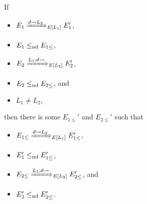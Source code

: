 \begin{lem}
\label{lem:choice-control-lifting}
If
\begin{itemize}
  \item $E_1 \ctrlsteploc[d \sendsto L_2]{L_1} E_1'$,
  \item $E_1 \leq_{\text{nd}} E_{1 \leq}$,
  \item $E_2 \ctrlsteploc[L_1;d \sendsto]{L_2} E_2'$,
  \item $E_2 \leq_{\text{nd}} E_{2 \leq}$, and
  \item $L_1 \neq L_2$,
\end{itemize}
then there is some $E_{1 \leq}'$ and $E_{2 \leq}'$ such that
\begin{itemize}
  \item $E_{1 \leq} \ctrlsteploc[d \sendsto L_2]{L_1} E_{1 \leq}'$,
  \item $E_1' \leq_{\text{nd}} E_{1 \leq}'$,
  \item $E_{2 \leq} \ctrlsteploc[L_1;d \sendsto]{L_2} E_{2 \leq}'$, and
  \item $E_2' \leq_{\text{nd}} E_{2 \leq}'$.
\end{itemize}
\end{lem}
  
\todo
{}
\label{sec:lifting-proof}
